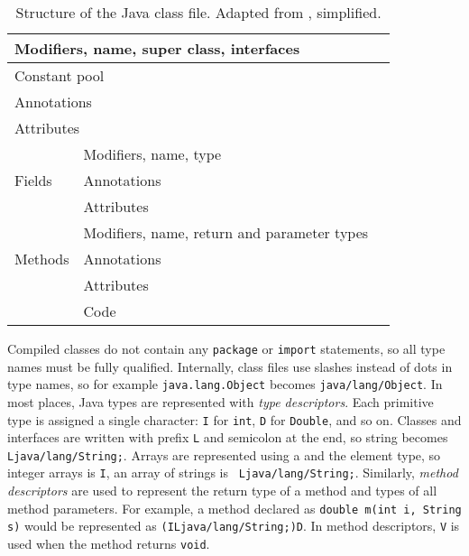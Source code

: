 \begin{table}
    \begin{center}
        \label{classfile}
        \begin{tabular}{|l|l|l|}
            \hline
            \multicolumn{2}{|l|}{Modifiers, name, super class, interfaces} \\
            \hline
            \multicolumn{2}{|l|}{Constant pool} \\
            \hline
            \multicolumn{2}{|l|}{Annotations} \\
            \hline
            \multicolumn{2}{|l|}{Attributes} \\
            \hline
            \multirow{3}{*}{Fields} & Modifiers, name, type \\
            & Annotations \\
            & Attributes \\
            \hline
            \multirow{3}{*}{Methods} & Modifiers, name, return and parameter types \\
            & Annotations \\
            & Attributes \\
            & Code \\
            \hline
        \end{tabular}
        \caption{Structure of the Java class file. Adapted from \cite{asmguide},
        simplified.}
    \end{center}
\end{table}

Compiled classes do not contain any \texttt{package} or \texttt{import}
statements, so all type names must be fully qualified. Internally, class files
use slashes instead of dots in type names, so for example
\texttt{java.lang.Object} becomes \texttt{java/lang/Object}. In most places,
Java types are represented with \emph{type descriptors}. Each primitive type is
assigned a single character: \texttt{I} for \texttt{int}, \texttt{D} for
\texttt{Double}, and so on. Classes and interfaces are written with prefix
\texttt{L} and semicolon at the end, so string becomes
\texttt{Ljava/lang/String;}. Arrays are represented using a
\texttt{\leftbracket} and the element type, so integer arrays is
\texttt{\leftbracket I}, an array of strings is \texttt{\leftbracket
Ljava/lang/String;}. Similarly, \emph{method descriptors} are used to represent
the return type of a method and types of all method parameters. For example, a
method declared as \texttt{double m(int i, String s)} would be represented as
\texttt{(ILjava/lang/String;)D}. In method descriptors, \texttt{V} is used when
the method returns \texttt{void}.

